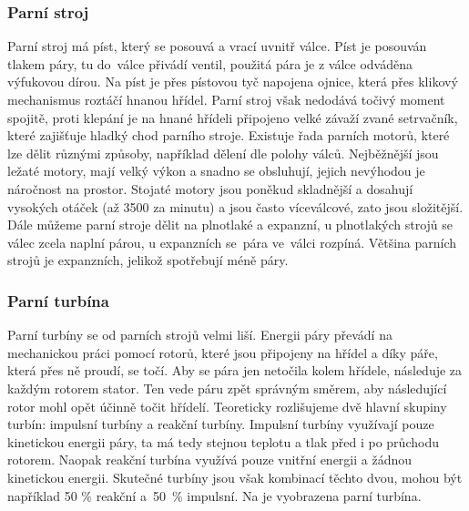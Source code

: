\subsubsection{Parní stroj}\label{sc:ParniStroj}
{Parní stroj má píst, který se posouvá a vrací uvnitř válce. Píst je posouván tlakem páry, tu do~válce přivádí ventil, použitá pára je z válce odváděna výfukovou dírou. Na píst je přes pístovou tyč napojena ojnice, která přes klikový mechanismus roztáčí hnanou hřídel. Parní stroj však nedodává točivý moment spojitě, proti klepání je na hnané hřídeli připojeno velké závaží zvané setrvačník, které zajišťuje hladký chod parního stroje.}
\cite{st:parniStroj}\cite{vutb:parniStroj}\odst
{Existuje řada parních motorů, které lze dělit různými způsoby, například dělení dle polohy válců. Nejběžnější jsou ležaté motory, mají velký výkon a snadno se obsluhují, jejich nevýhodou je náročnost na prostor. Stojaté motory jsou poněkud skladnější a dosahují vysokých otáček (až 3500 za minutu) a jsou často víceválcové, zato jsou složitější. Dále můžeme parní stroje dělit na plnotlaké a expanzní, u plnotlakých strojů se válec zcela naplní párou, u expanzních se~pára ve~válci rozpíná. Většina parních strojů je expanzních, jelikož spotřebují méně páry.}
\cite{st:parniStroj}\cite{vutb:parniStroj}

\newpage

\subsubsection{Parní turbína}\label{sc:ParniTurbina}
{Parní turbíny se od parních strojů velmi liší. Energii páry převádí na mechanickou práci pomocí rotorů, které jsou připojeny na hřídel a díky páře, která přes ně proudí, se točí. Aby se pára jen netočila kolem hřídele, následuje za každým rotorem stator. Ten vede páru zpět správným směrem, aby následující rotor mohl opět účinně točit hřídelí.}
\cite{LESICS:WorkingOfSteamTurbine}\odst
{Teoreticky rozlišujeme dvě hlavní skupiny turbín: impulsní turbíny a reakční turbíny. Impulsní turbíny využívají pouze kinetickou energii páry, ta má tedy stejnou teplotu a tlak před i po průchodu rotorem. Naopak reakční turbína využívá pouze vnitřní energii a žádnou kinetickou energii. Skutečné turbíny jsou však kombinací těchto dvou, mohou být například 50 \% reakční a~50~\% impulsní. Na  je vyobrazena parní turbína.}
\cite{LESICS:WorkingOfSteamTurbine}

